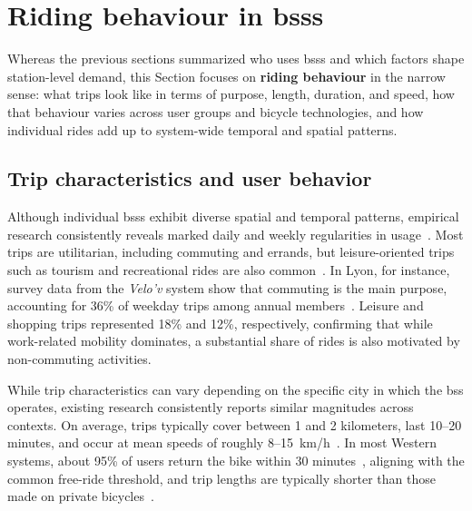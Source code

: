         
\section[Riding behaviour in BSSs]{Riding behaviour in \acp{bss}}

Whereas the previous sections summarized who uses \acp{bss} and which factors shape station-level demand, this Section focuses on \textbf{riding behaviour} in the narrow sense: what trips look like in terms of purpose, length, duration, and speed, how that behaviour varies across user groups and bicycle technologies, and how individual rides add up to system-wide temporal and spatial patterns.

    \subsection{Trip characteristics and user behavior}


Although individual \acp{bss} exhibit diverse spatial and temporal patterns, empirical research consistently reveals marked daily and weekly regularities in usage~\cite{Fishman2016}. Most trips are utilitarian, including commuting and errands, but leisure-oriented trips such as tourism and recreational rides are also common~\cite{Ricci2015, Fishman2016, Willberg2021, CapitalBikeshare2013, Xu2019_Unravel, Buck2013, Raux2017, Lin2018}. In Lyon, for instance, survey data from the \textit{Velo’v} system show that commuting is the main purpose, accounting for 36\% of weekday trips among annual members~\cite{Raux2017}. Leisure and shopping trips represented 18\% and 12\%, respectively, confirming that while work-related mobility dominates, a substantial share of rides is also motivated by non-commuting activities.


While trip characteristics can vary depending on the specific city in which the \ac{bss} operates, existing research consistently reports similar magnitudes across contexts. On average, trips typically cover between 1 and 2 kilometers, last 10–20 minutes, and occur at mean speeds of roughly 8–15~km/h~\cite{Fishman2014, Zhang2016Bicycle, Levy2019, Zhao2015, MateoBabiano2016, FaghihImani2017_Hail, Yang2024}. In most Western systems, about 95\% of users return the bike within 30 minutes~\cite{Zhao2015, MateoBabiano2016}, aligning with the common free-ride threshold, and trip lengths are typically shorter than those made on private bicycles~\cite{CastilloManzano2015}. 

